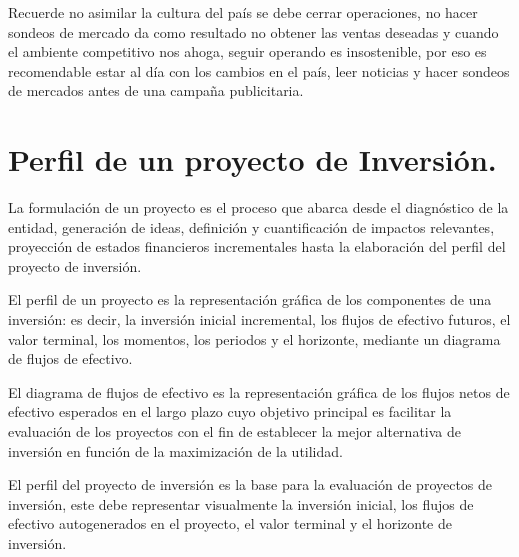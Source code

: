 \documentclass[12pt, a4paper]{article}
\begin{document}
Recuerde no asimilar la cultura del país se debe cerrar operaciones, no hacer sondeos de mercado da como resultado no obtener las ventas deseadas y cuando el ambiente competitivo nos ahoga, seguir operando es insostenible, por eso es recomendable estar al día con los cambios en el país, leer noticias y hacer sondeos de mercados antes de una campaña publicitaria.

\section{Perfil de un proyecto de Inversión.}

La formulación de un proyecto es el proceso que abarca desde el diagnóstico de la entidad, generación de ideas, definición y cuantificación de impactos relevantes, proyección de estados financieros incrementales hasta la elaboración del perfil del proyecto de inversión.

El perfil de un proyecto es la representación gráfica de los componentes de una inversión: es decir, la inversión inicial incremental, los flujos de efectivo futuros, el valor terminal, los momentos, los periodos y el horizonte, mediante un diagrama de flujos de efectivo.

\begin{center}
\end{center}

El diagrama de flujos de efectivo es la representación gráfica de los flujos netos de efectivo esperados en el largo plazo cuyo objetivo principal es facilitar la evaluación de los proyectos con el fin de establecer la mejor alternativa de inversión en función de la maximización de la utilidad.

El perfil del proyecto de inversión es la base para la evaluación de proyectos de inversión, este debe representar visualmente la inversión inicial, los flujos de efectivo autogenerados en el proyecto, el valor terminal y el horizonte de inversión.
\end{document}
